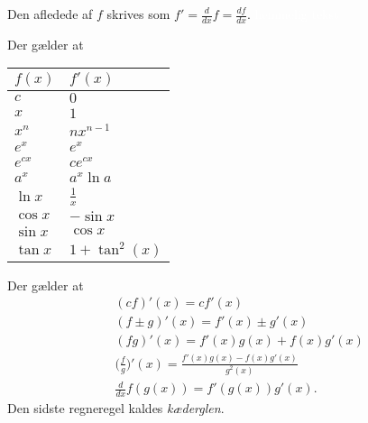 Den afledede af $f$ skrives som $f'=\frac{d}{dx}f=\frac{df}{dx}$.
\textcolor{white}{hemmelig tekst}

Der gælder at
\begin{center}
		\begin{tabular}{@{}l l@{}}
		$f(x)$      & $f'(x)$  				\\ \toprule
		$c$			& $0$ 					\\ \midrule
		$x$			& $1$					\\ \midrule
		$x^n$  		& $nx^{n-1}$			\\ \midrule
		$e^x$  		& $e^x$					\\ \midrule
		$e^{cx}$  	& $ce^{cx}$				\\ \midrule
		$a^x$  		& $a^x\ln a $			\\ \midrule
		$\ln x$ 	& $\frac{1}{x}$			\\ \midrule
		$\cos x$  	& $-\sin x$				\\ \midrule
		$\sin x$  	& $\cos x$				\\ \midrule
		$\tan x$ 	& $1+\tan^2(x)$		\\ \bottomrule  
	\end{tabular}
\end{center}
Der gælder at
\begin{align*}
&(cf)'(x)=cf'(x)\\
&(f\pm g)'(x)=f'(x)\pm g'(x)\\
&(fg)'(x)=f'(x)g(x)+f(x)g'(x)\\
&\Big(\frac{f}{g}\Big)'(x)=\frac{f'(x)g(x)-f(x)g'(x)}{g^2(x)}\\
&\frac{d}{dx}f(g(x))=f'(g(x))g'(x).
\end{align*}
Den sidste regneregel kaldes \emph{kæderglen}.